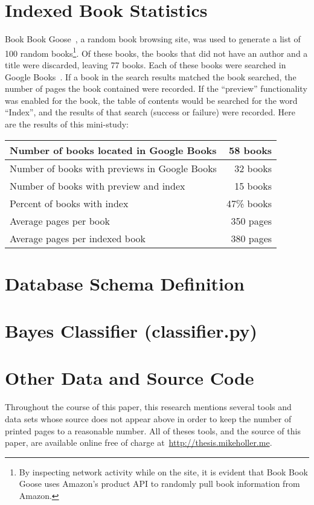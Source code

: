 \newpage \appendix \appendixpage \addappheadtotoc
\section{Indexed Book Statistics}
\label{appendix:d}

Book Book Goose~\cite{book-book-goose}, a random book browsing site, was used to generate a list of 100 random books\footnote{By inspecting network activity while on the site, it is evident that Book Book Goose uses Amazon's product API\cite{amazon-products} to randomly pull book information from Amazon.}.
Of these books, the books that did not have an author and a title were discarded, leaving 77 books.
Each of these books were searched in Google Books~\cite{google-books}.
If a book in the search results matched the book searched, the number of pages the book contained were recorded.
If the ``preview'' functionality was enabled for the book, the table of contents would be searched for the word ``Index'', and the results of that search (success or failure) were recorded.
Here are the results of this mini-study:

\begin{center}
\begin{tabular}{|l|r|}
\hline 
Number of books located in Google Books & 58 books \\ 
\hline 
Number of books with previews in Google Books & 32 books \\ 
\hline 
Number of books with preview and index & 15 books \\ 
\hline 
Percent of books with index & 47\% books \\ 
\hline
Average pages per book & 350 pages \\ 
\hline 
Average pages per indexed book & 380 pages \\ 
\hline 
\end{tabular}
\end{center}


\section{Database Schema Definition}
\label{appendix:a}


\section{\Naive Bayes Classifier (classifier.py)}
\label{appendix:b}


\section{Other Data and Source Code}
\label{appendix:c}

Throughout the course of this paper, this research mentions several tools and data sets whose source does not appear above in order to keep the number of printed pages to a reasonable number.
All of theses tools, and the source of this paper, are available online free of charge at~\url{http://thesis.mikeholler.me}.